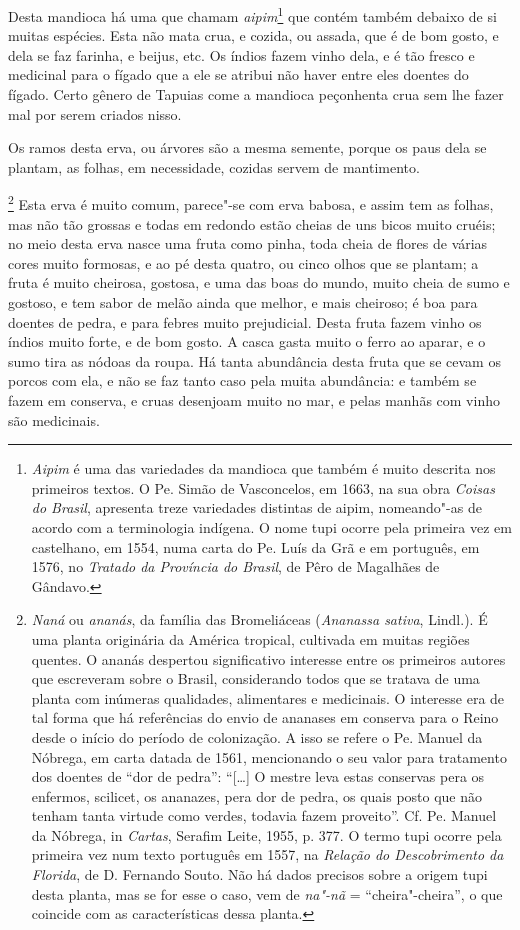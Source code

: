  Desta mandioca há uma que chamam \textit{aipim}\footnote{ \textit{Aipim} 
é uma das variedades da mandioca que também é muito
descrita nos primeiros textos. O Pe. Simão de Vasconcelos, em 1663, na
sua obra \textit{Coisas do Brasil}, apresenta treze variedades
distintas de aipim, nomeando"-as de acordo com a terminologia indígena.
O nome tupi ocorre pela primeira vez em castelhano, em 1554, numa
carta do Pe. Luís da Grã e em português, em 1576, no
\textit{Tratado da Província do Brasil}, de Pêro de Magalhães de Gândavo.} 
 que contém também debaixo de si muitas espécies. Esta não mata crua, e
cozida, ou assada, que é de bom gosto, e dela se faz farinha, e beijus,
etc. Os índios fazem vinho dela, e é tão fresco e medicinal para o
fígado que a ele se atribui não haver entre eles doentes do fígado.
Certo gênero de Tapuias come a mandioca peçonhenta crua sem lhe fazer
mal por serem criados nisso.

 Os ramos desta erva, ou árvores são a mesma semente, porque os paus
dela se plantam, as folhas, em necessidade, cozidas servem de mantimento. 

\footnote{ \textit{Naná} ou \textit{ananás}, 
da família das Bromeliáceas (\textit{Ananassa sativa}, Lindl.). É uma
planta originária da América tropical, cultivada em muitas regiões
quentes. O ananás despertou significativo interesse entre os primeiros
autores que escreveram sobre o Brasil, considerando todos que se
tratava de uma planta com inúmeras qualidades, alimentares e
medicinais. O interesse era de tal forma que há referências do envio de
ananases em conserva para o Reino desde o início do período de
colonização. A isso se refere o Pe. Manuel da Nóbrega, em carta datada
de 1561, mencionando o seu valor para tratamento dos doentes de ``dor
de pedra'': ``[\ldots] O mestre leva estas conservas pera os enfermos,
scilicet, os ananazes, pera dor de pedra, os quais posto que não tenham
tanta virtude como verdes, todavia fazem proveito''. Cf. Pe. Manuel da
Nóbrega, in \textit{Cartas}, Serafim Leite, 1955, p. 377. O termo tupi
ocorre pela primeira vez num texto português em 1557, na
\textit{Relação do Descobrimento da Florida}, de D. Fernando Souto. Não
há dados precisos sobre a origem tupi desta planta, mas se for esse o
caso, vem de \textit{na"-nã} = ``cheira"-cheira'', o que coincide com as
características dessa planta.} Esta erva é muito comum,
parece"-se com erva babosa, e assim tem as folhas, mas não tão grossas e
todas em redondo estão cheias de uns bicos muito cruéis; no meio desta
erva nasce uma fruta como pinha, toda cheia de flores de várias cores
muito formosas, e ao pé desta quatro, ou cinco olhos que se plantam; a
fruta é muito cheirosa, gostosa, e uma das boas do mundo, muito cheia
de sumo e gostoso, e tem sabor de melão ainda que melhor, e mais
cheiroso; é boa para doentes de pedra, e para febres muito prejudicial.
Desta fruta fazem vinho os índios muito forte, e de bom gosto. A casca
gasta muito o ferro ao aparar, e o sumo tira as nódoas da roupa. Há
tanta abundância desta fruta que se cevam os porcos com ela, e não se
faz tanto caso pela muita abundância: e também se fazem em conserva, e
cruas desenjoam muito no mar, e pelas manhãs com vinho são \mbox{medicinais.} \enlargethispage{\baselineskip}


